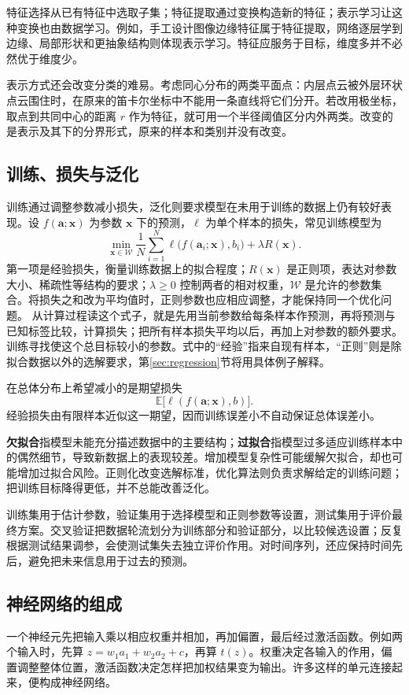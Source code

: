 \documentclass[UTF8,fontset=fandol,a4paper,12pt]{ctexart}
\newcommand{\E}{\mathbb E}
\newcommand{\vx}{\boldsymbol x}
\newcommand{\va}{\boldsymbol a}
\theoremstyle{definition}
\begin{document}
特征选择从已有特征中选取子集；特征提取通过变换构造新的特征；表示学习让这种变换也由数据学习。例如，手工设计图像边缘特征属于特征提取，网络逐层学到边缘、局部形状和更抽象结构则体现表示学习。特征应服务于目标，维度多并不必然优于维度少。

表示方式还会改变分类的难易。考虑同心分布的两类平面点：内层点云被外层环状点云围住时，在原来的笛卡尔坐标中不能用一条直线将它们分开。若改用极坐标，取点到共同中心的距离 $r$ 作为特征，就可用一个半径阈值区分内外两类。改变的是表示及其下的分界形式，原来的样本和类别并没有改变。

\subsection{训练、损失与泛化}
训练通过调整参数减小损失，泛化则要求模型在未用于训练的数据上仍有较好表现。设 $f(\va;\vx)$ 为参数 $\vx$ 下的预测，$\ell$ 为单个样本的损失，常见训练模型为
\begin{equation}\label{eq:learning}
 \boxed{\min_{\vx\in\mathcal W}\frac1N\sum_{i=1}^N
 \ell\bigl(f(\va_i;\vx),b_i\bigr)+\lambda R(\vx).}
\end{equation}
第一项是经验损失，衡量训练数据上的拟合程度；$R(\vx)$ 是正则项，表达对参数大小、稀疏性等结构的要求；$\lambda\ge0$ 控制两者的相对权重，$\mathcal W$ 是允许的参数集合。将损失之和改为平均值时，正则参数也应相应调整，才能保持同一个优化问题。
从计算过程读这个式子，就是先用当前参数给每条样本作预测，再将预测与已知标签比较，计算损失；把所有样本损失平均以后，再加上对参数的额外要求。训练寻找使这个总目标较小的参数。式中的“经验”指来自现有样本，“正则”则是除拟合数据以外的选解要求，第\ref{sec:regression}节将用具体例子解释。

在总体分布上希望减小的是期望损失
\[
 \E\bigl[\ell(f(\va;\vx),b)\bigr].
\]
经验损失由有限样本近似这一期望，因而训练误差小不自动保证总体误差小。

\textbf{欠拟合}指模型未能充分描述数据中的主要结构；\textbf{过拟合}指模型过多适应训练样本中的偶然细节，导致新数据上的表现较差。增加模型复杂性可能缓解欠拟合，却也可能增加过拟合风险。正则化改变选解标准，优化算法则负责求解给定的训练问题；把训练目标降得更低，并不总能改善泛化。

训练集用于估计参数，验证集用于选择模型和正则参数等设置，测试集用于评价最终方案。交叉验证把数据轮流划分为训练部分和验证部分，以比较候选设置；反复根据测试结果调参，会使测试集失去独立评价作用。对时间序列，还应保持时间先后，避免把未来信息用于过去的预测。

\subsection{神经网络的组成}
一个神经元先把输入乘以相应权重并相加，再加偏置，最后经过激活函数。例如两个输入时，先算 $z=w_1a_1+w_2a_2+c$，再算 $t(z)$。权重决定各输入的作用，偏置调整整体位置，激活函数决定怎样把加权结果变为输出。许多这样的单元连接起来，便构成神经网络。
\end{document}
